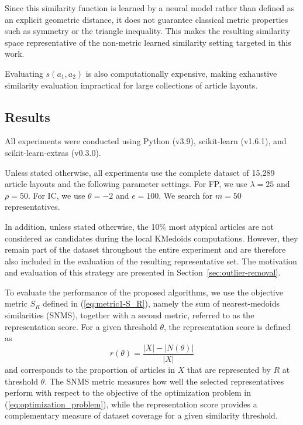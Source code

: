 \documentclass{ieeeaccess}
\newcommand{\toblack}{\color{black}}
\newcommand{\tored}{\color{red}}
\newcommand{\pk}[1]{{\tored [{\bfseries Pierre}: {\itshape #1}] \toblack}}
\newcommand{\maxpartitionsize}{\rho}
\newcommand{\threshold}{\theta}
\newcommand{\samplesize}{e}
\newcommand{\reductionfactor}{\lambda}
\newcommand{\kmedoidsalg}{KMedoids\xspace}
\newcommand{\partitioning}{FP\xspace}
\newcommand{\inclusion}{IC\xspace}
\begin{document}
Since this similarity function is learned by a neural model rather than defined as an explicit geometric distance, it does not guarantee classical metric properties such as symmetry or the triangle inequality. This makes the resulting similarity space representative of the non-metric learned similarity setting targeted in this work.

Evaluating $s(a_1,a_2)$ is also computationally expensive, making exhaustive similarity evaluation impractical for large collections of article layouts.

\subsection{Results}

All experiments were conducted using Python (v3.9), scikit-learn (v1.6.1), and scikit-learn-extras (v0.3.0).

Unless stated otherwise, all experiments use the complete dataset of 15,289 article layouts and the following parameter settings. For \partitioning, we use $\reductionfactor=25$ and $\maxpartitionsize=50$. For \inclusion, we use $\threshold=-2$ and $\samplesize=100$. We search for $m=50$ representatives.

In addition, unless stated otherwise, the 10\% most atypical articles are not considered as candidates during the local \kmedoidsalg computations. However, they remain part of the dataset throughout the entire experiment and are therefore also included in the evaluation of the resulting representative set. The motivation and evaluation of this strategy are presented in Section~\ref{sec:outlier-removal}.

To evaluate the performance of the proposed algorithms, we use the objective metric $S_R$ defined in (\ref{eq:metric1-S_R}), namely the sum of nearest-medoids similarities (SNMS), together with a second metric, referred to as the representation score. For a given threshold $\threshold$, the representation score is defined as
\begin{equation}
    r(\threshold) =
    \frac{|X|-|N(\threshold)|}{|X|}
    \label{eq:representation_metric}
\end{equation}
and corresponds to the proportion of articles in $X$ that are represented by $R$ at threshold $\threshold$. The SNMS metric measures how well the selected representatives perform with respect to the objective of the optimization problem in (\ref{eq:optimization_problem}), while the representation score provides a complementary measure of dataset coverage for a given similarity threshold.
\end{document}
